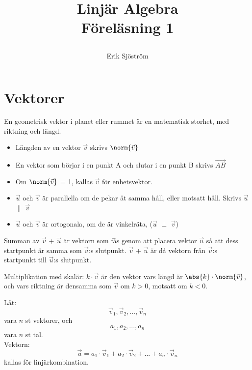 

\title{
	Linjär Algebra\\
	Föreläsning 1
	\author{Erik Sjöström}
}



\maketitle

\section{Vektorer} %
\label{sec:vektorer}

\begin{Def}
    En geometrisk vektor i planet eller rummet är en matematisk storhet, med riktning och längd.
\end{Def}

\begin{itemize}
  \item Längden av en vektor $\vec{v}$ skrivs $\norm{\vec{v}}$
  \item En vektor som börjar i en punkt A och slutar i en punkt B skrivs $\overrightarrow{AB}$
  \item Om $\norm{\vec{v}}$ = 1, kallas $\vec{v}$ för enhetsvektor.
  \item $\vec{u}$ och $\vec{v}$ är parallella om de pekar åt samma håll, eller motsatt håll. Skrivs $\vec{u}$ $\parallel$ $\vec{v}$
  \item $\vec{u}$ och $\vec{v}$ är ortogonala, om de är vinkelräta, ($\vec{u}$ $\perp$ $\vec{v}$)
\end{itemize}

\begin{Def}
    Summan av $\vec{v}$ + $\vec{u}$ är vektorn som fås genom att placera vektor $\vec{u}$ så att dess startpunkt är samma som $\vec{v}$:s slutpunkt. $\vec{v}$ + $\vec{u}$ är då vektorn från $\vec{v}$:s startpunkt till $\vec{u}$:s slutpunkt.
\end{Def}

\begin{Def}
    Multiplikation med skalär: $k \cdot \vec{v}$ är den vektor vars längd är $\abs{k} \cdot \norm{\vec{v}}$, och vars riktning är densamma som $\vec{v}$ om $k > 0$, motsatt om $k < 0$.
\end{Def}

\noindent
Låt: 
\[
     \vec{v}_1, \vec{v}_2,...,\vec{v}_n
 \] vara $n$ st vektorer, och 
 \[
     a_1, a_2,...,a_n
 \]
vara $n$ st tal.\\ 
Vektorn: 
\[
     \vec{u} = a_1 \cdot \vec{v}_1 + a_2 \cdot \vec{v}_2 + ... + a_n \cdot \vec{v}_n
 \] 
kallas för linjärkombination.\\

